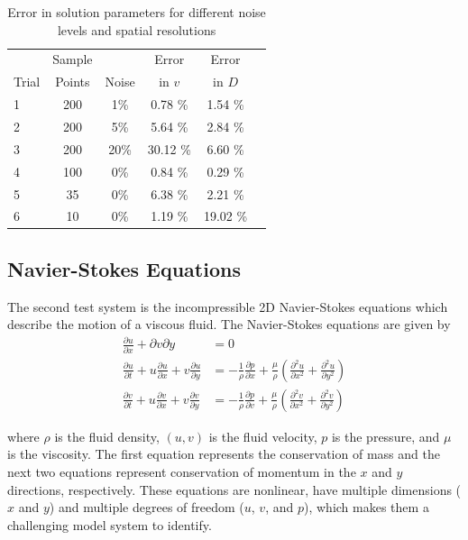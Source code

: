 \documentclass{article}
\begin{document}
\begin{table}[t]
\caption{Error in solution parameters for different noise levels and spatial resolutions}
\label{tab:advdifresults}
\vskip 0.15in
\begin{center}
\begin{small}
\begin{sc}
\begin{tabular}{lccccr}
\toprule
 & Sample &  & Error & Error\\
Trial & Points & Noise & in $v$ & in $D$\\
\midrule
1 & 200 & 1\%  & 0.78 \% & 1.54 \% \\
2 & 200 & 5\%  & 5.64 \% & 2.84 \% \\
3 & 200 & 20\%  & 30.12 \% & 6.60 \% \\
4 & 100 & 0\%  & 0.84 \% & 0.29 \% \\
5 & 35 & 0\%  & 6.38 \% & 2.21 \% \\
6 & 10 & 0\%  & 1.19 \% & 19.02 \% \\
\bottomrule
\end{tabular}
\end{sc}
\end{small}
\end{center}
\vskip -0.1in
\end{table}


\subsection{Navier-Stokes Equations}
The second test system is the incompressible 2D Navier-Stokes equations which describe the motion of a viscous fluid. The Navier-Stokes equations are given by
\begin{align}
  \frac{\partial u}{\partial x} + \partial{v}{\partial y} &= 0 \\
  \frac{\partial u }{\partial t} + u \frac{\partial u }{\partial x} + v \frac{\partial u }{\partial y} &= - \frac{1}{\rho} \frac{\partial p}{\partial x} + \frac{\mu}{\rho}\left( \frac{\partial^2 u}{\partial x^2} + \frac{\partial^2 u}{\partial y^2} \right) \\
\frac{\partial v }{\partial t} + u \frac{\partial v }{\partial x} + v \frac{\partial v }{\partial y} &= - \frac{1}{\rho} \frac{\partial p}{\partial v} + \frac{\mu}{\rho}\left( \frac{\partial^2 v}{\partial x^2} + \frac{\partial^2 v}{\partial y^2} \right)
\end{align}

where $\rho$ is the fluid density, $(u, v)$ is the fluid velocity, $p$ is the pressure, and $\mu$ is the viscosity. The first equation represents the conservation of mass and the next two equations represent conservation of momentum in the $x$ and $y$ directions, respectively. These equations are nonlinear, have multiple dimensions ($x$ and $y$) and multiple degrees of freedom ($u$, $v$, and $p$), which makes them a challenging model system to identify.
\end{document}
